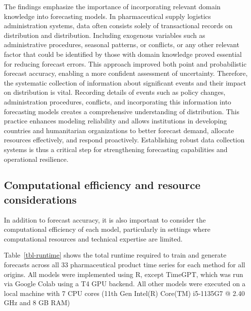 \documentclass[
  authoryear,
  preprint,
  3p]{elsarticle}
\begin{document}
The findings emphasize the importance of incorporating relevant domain
knowledge into forecasting models. In pharmaceutical supply logistics
administration systems, data often consists solely of transactional
records on distribution and distribution. Including exogenous variables
such as administrative procedures, seasonal patterns, or conflicts, or
any other relevant factor that could be identified by those with domain
knowledge proved essential for reducing forecast errors. This approach
improved both point and probabilistic forecast accuracy, enabling a more
confident assessment of uncertainty. Therefore, the systematic
collection of information about significant events and their impact on
distribution is vital. Recording details of events such as policy
changes, administration procedures, conflicts, and incorporating this
information into forecasting models creates a comprehensive
understanding of distribution. This practice enhances modeling
reliability and allows institutions in developing countries and
humanitarian organizations to better forecast demand, allocate resources
effectively, and respond proactively. Establishing robust data
collection systems is thus a critical step for strengthening forecasting
capabilities and operational resilience.

\subsection{Computational efficiency and resource
considerations}\label{computational-efficiency-and-resource-considerations}

In addition to forecast accuracy, it is also important to consider the
computational efficiency of each model, particularly in settings where
computational resources and technical expertise are limited.

Table~\ref{tbl-runtime} shows the total runtime required to train and
generate forecasts across all 33 pharmaceutical product time series for
each method for all origins. All models were implemented using R, except
TimeGPT, which was run via Google Colab using a T4 GPU backend. All
other models were executed on a local machine with 7 CPU cores (11th Gen
Intel(R) Core(TM) i5-1135G7 @ 2.40 GHz and 8 GB RAM)
\end{document}
